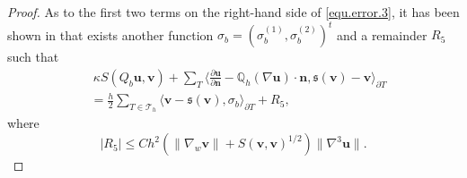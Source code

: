 \documentclass[final,leqno]{siamltex704}
\def\S{{\mathfrak s}}
\def\T{{\mathcal T}}
\def\pT{{\partial T}}
\begin{document}
\begin{proof}
As to the first two terms on the right-hand side of \eqref{equ.error.3}, it has been shown in \cite{LiDanWW} that exists another function $\sigma_b=(\sigma_b^{(1)},  \sigma_b^{(2)})^t$ and a remainder $R_5$ such that
\begin{equation}\label{EQ:div:012}
\begin{split}
&\ \kappa {S}(Q_b\bm{u},\bm{v})
+ \sum_{T}\langle \frac{\partial \bm{u}}{\partial \bm{n}}- \mathbb{Q}_h(\nabla \bm{u})\cdot\bm{n},\S(\bm{v})-\bm{v}\rangle_{\partial T}\\
& = \frac{h}{2} \sum_{T\in\T_h} \langle \bm{v} - \S(\bm{v}), \sigma_b\rangle_\pT + R_5,
\end{split}
\end{equation}
where
\begin{equation}\label{EQ:div:013}
|R_5|
\leq C h^2 \left(\|\nabla_w\bm{v}\| + S(\bm{v}, \bm{v})^{1/2}\right) \|\nabla^3 \bm{u}\|.
\end{equation}


\end{proof}
\end{document}
